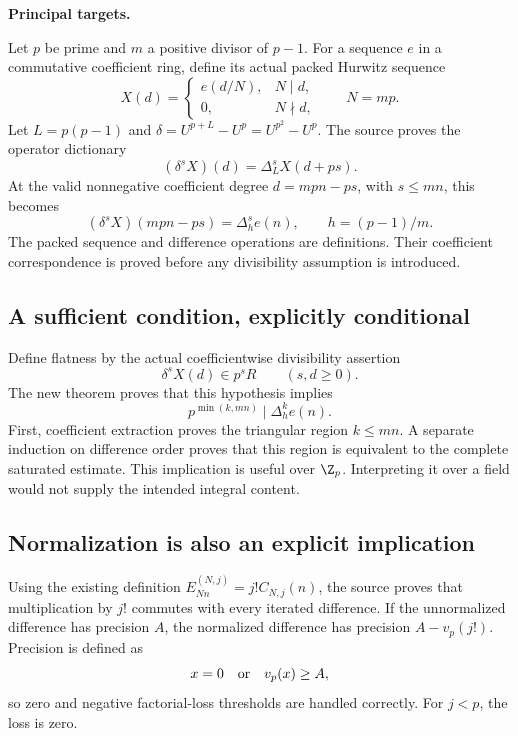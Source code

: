 \textbf{Principal targets.}\par
{}\par
{}\par
{}\par
{}\par
{}

\par\medskip
{}
Let $p$ be prime and $m$ a positive divisor of $p-1$. For a sequence $e$ in a commutative coefficient ring, define its actual packed Hurwitz sequence
\[
 X(d)=\begin{cases}e(d/N),&N\mid d,\\0,&N\nmid d,\end{cases}
 \qquad N=mp.
\]
Let $L=p(p-1)$ and $\delta=U^{p+L}-U^p=U^{p^2}-U^p$. The source proves the operator dictionary
\[
 (\delta^sX)(d)=\Delta_L^s X(d+ps).
\]
At the valid nonnegative coefficient degree $d=mpn-ps$, with $s\le mn$, this becomes
\[
 (\delta^sX)(mpn-ps)=\Delta_h^s e(n),\qquad h=(p-1)/m.
\]
The packed sequence and difference operations are definitions. Their coefficient correspondence is proved before any divisibility assumption is introduced.

\subsection*{A sufficient condition, explicitly conditional}
Define flatness by the actual coefficientwise divisibility assertion
\[
 \delta^sX(d)\in p^sR\qquad(s,d\ge0).
\]
The new theorem proves that this hypothesis implies
\[
 \boxed{p^{\min(k,mn)}\mid\Delta_h^k e(n).}
\]
First, coefficient extraction proves the triangular region $k\le mn$. A separate induction on difference order proves that this region is equivalent to the complete saturated estimate. This implication is useful over $\Z_p$. Interpreting it over a field would not supply the intended integral content.

\subsection*{Normalization is also an explicit implication}
Using the existing definition $E^{(N,j)}_{Nn}=j!C_{N,j}(n)$, the source proves that multiplication by $j!$ commutes with every iterated difference. If the unnormalized difference has precision $A$, the normalized difference has precision $A-v_p(j!)$. Precision is defined as
\[
 x=0\quad\hbox{or}\quad v_p(x)\ge A,
\]
so zero and negative factorial-loss thresholds are handled correctly. For $j<p$, the loss is zero.


